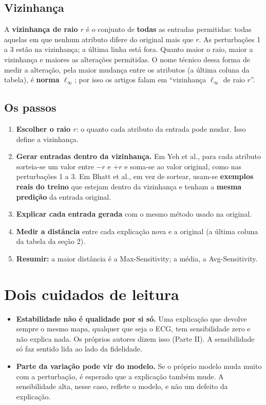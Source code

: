 \documentclass[11pt,a4paper]{article}
\begin{document}
\subsection{Vizinhança}
A \textbf{vizinhança de raio $r$} é o conjunto de \textbf{todas} as entradas permitidas: todas aquelas em que nenhum atributo difere do original mais que $r$. As perturbações 1 a 3 estão na vizinhança; a última linha está fora. Quanto maior o raio, maior a vizinhança e maiores as alterações permitidas. O nome técnico dessa forma de medir a alteração, pela maior mudança entre os atributos (a última coluna da tabela), é \textbf{norma $\ell_\infty$}; por isso os artigos falam em “vizinhança $\ell_\infty$ de raio $r$”.

\subsection{Os passos}
\begin{enumerate}
\item \textbf{Escolher o raio $r$}: o quanto cada atributo da entrada pode mudar. Isso define a vizinhança.
\item \textbf{Gerar entradas dentro da vizinhança.} Em Yeh et al., para cada atributo sorteia-se um valor entre $-r$ e $+r$ e soma-se ao valor original, como nas perturbações 1 a 3. Em Bhatt et al., em vez de sortear, usam-se \textbf{exemplos reais do treino} que estejam dentro da vizinhança e tenham a \textbf{mesma predição} da entrada original.
\item \textbf{Explicar cada entrada gerada} com o mesmo método usado na original.
\item \textbf{Medir a distância} entre cada explicação nova e a original (a última coluna da tabela da seção 2).
\item \textbf{Resumir:} a maior distância é a Max-Sensitivity; a média, a Avg-Sensitivity.
\end{enumerate}

\section{Dois cuidados de leitura}
\begin{itemize}
\item \textbf{Estabilidade não é qualidade por si só.} Uma explicação que devolve sempre o mesmo mapa, qualquer que seja o ECG, tem sensibilidade zero e não explica nada. Os próprios autores dizem isso (Parte II). A sensibilidade só faz sentido lida ao lado da fidelidade.
\item \textbf{Parte da variação pode vir do modelo.} Se o próprio modelo muda muito com a perturbação, é esperado que a explicação também mude. A sensibilidade alta, nesse caso, reflete o modelo, e não um defeito da explicação.
\end{itemize}
\end{document}
